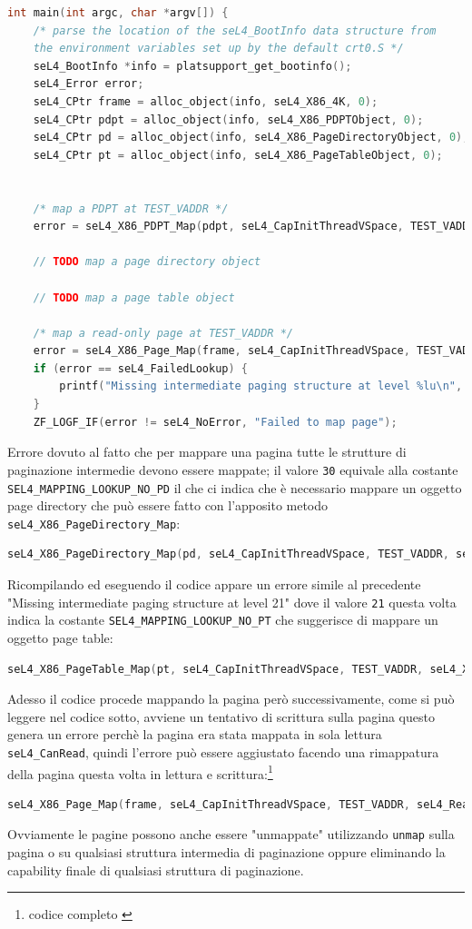 \begin{lstlisting}[language=C++]
int main(int argc, char *argv[]) {
    /* parse the location of the seL4_BootInfo data structure from
    the environment variables set up by the default crt0.S */
    seL4_BootInfo *info = platsupport_get_bootinfo();
    seL4_Error error;
    seL4_CPtr frame = alloc_object(info, seL4_X86_4K, 0);
    seL4_CPtr pdpt = alloc_object(info, seL4_X86_PDPTObject, 0);
    seL4_CPtr pd = alloc_object(info, seL4_X86_PageDirectoryObject, 0);
    seL4_CPtr pt = alloc_object(info, seL4_X86_PageTableObject, 0);


    /* map a PDPT at TEST_VADDR */
    error = seL4_X86_PDPT_Map(pdpt, seL4_CapInitThreadVSpace, TEST_VADDR, seL4_X86_Default_VMAttributes);

    // TODO map a page directory object

    // TODO map a page table object

    /* map a read-only page at TEST_VADDR */
    error = seL4_X86_Page_Map(frame, seL4_CapInitThreadVSpace, TEST_VADDR, seL4_CanRead, seL4_X86_Default_VMAttributes);
    if (error == seL4_FailedLookup) {
        printf("Missing intermediate paging structure at level %lu\n", seL4_MappingFailedLookupLevel());
    }
    ZF_LOGF_IF(error != seL4_NoError, "Failed to map page");
\end{lstlisting}
Errore dovuto al fatto che per mappare una pagina tutte le strutture di paginazione intermedie devono essere mappate; il valore \texttt{30} equivale alla costante \texttt{SEL4\_MAPPING\_LOOKUP\_NO\_PD} il che ci indica che è necessario mappare un oggetto page directory che può essere fatto con l'apposito metodo \texttt{seL4\_X86\_PageDirectory\_Map}:
\begin{lstlisting}[language=C++]
seL4_X86_PageDirectory_Map(pd, seL4_CapInitThreadVSpace, TEST_VADDR, seL4_X86_Default_VMAttributes);
\end{lstlisting}
Ricompilando ed eseguendo il codice appare un errore simile al precedente "Missing intermediate paging structure at level 21" dove il valore \texttt{21} questa volta indica la costante \texttt{SEL4\_MAPPING\_LOOKUP\_NO\_PT} che suggerisce di mappare un oggetto page table:
\begin{lstlisting}[language=C++]
seL4_X86_PageTable_Map(pt, seL4_CapInitThreadVSpace, TEST_VADDR, seL4_X86_Default_VMAttributes);
\end{lstlisting}
Adesso il codice procede mappando la pagina però successivamente, come si può leggere nel codice sotto, avviene un tentativo di scrittura sulla pagina questo genera un errore perchè la pagina era stata mappata in sola lettura \texttt{seL4\_CanRead}, quindi l'errore può essere aggiustato facendo una rimappatura della pagina questa volta in lettura e scrittura:\footnote{codice completo \cite{mapping}}
\begin{lstlisting}[language=C++]
seL4_X86_Page_Map(frame, seL4_CapInitThreadVSpace, TEST_VADDR, seL4_ReadWrite, seL4_X86_Default_VMAttributes);
\end{lstlisting}
Ovviamente le pagine possono anche essere "unmappate" utilizzando \texttt{unmap} sulla pagina o su qualsiasi struttura intermedia di paginazione oppure eliminando la capability finale di qualsiasi struttura di paginazione.

